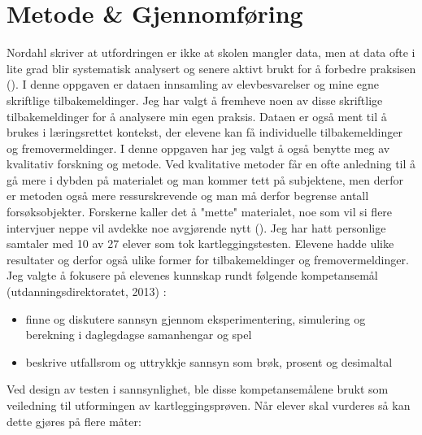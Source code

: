 \documentclass[main.tex]{subfiles}
\begin{document}
\section*{Metode \& Gjennomføring}
\label{sec:2}

Nordahl skriver at utfordringen er ikke at skolen mangler data, men at data ofte i lite grad blir
systematisk analysert og senere aktivt brukt for å forbedre praksisen ().
I denne oppgaven er dataen innsamling av elevbesvarelser og mine egne skriftlige tilbakemeldinger.
Jeg har valgt å fremheve noen av disse skriftlige tilbakemeldinger for å analysere min egen praksis.
Dataen er også ment til å brukes i læringsrettet kontekst, der elevene kan få
individuelle tilbakemeldinger og fremovermeldinger. 
\newline
\newline
I denne oppgaven har jeg valgt å også benytte meg av kvalitativ forskning og metode. Ved
kvalitative metoder får en ofte anledning til å gå mere i dybden på materialet og man kommer
tett på subjektene, men derfor er metoden også mere ressurskrevende og man må derfor
begrense antall forsøksobjekter. Forskerne kaller det å "mette" materialet, noe som vil si 
flere intervjuer neppe vil avdekke noe avgjørende nytt (). Jeg har hatt
personlige samtaler med 10 av 27 elever som tok kartleggingstesten. Elevene hadde ulike
resultater og derfor også ulike former for tilbakemeldinger og fremovermeldinger.
\newline
\newline
Jeg valgte å fokusere på elevenes kunnskap rundt følgende kompetansemål (utdanningsdirektoratet, 2013) :
\begin{itemize}
\item finne og diskutere sannsyn gjennom eksperimentering, simulering og berekning i daglegdagse samanhengar og spel
\item beskrive utfallsrom og uttrykkje sannsyn som brøk, prosent og desimaltal
\end{itemize}
Ved design av testen i sannsynlighet, ble disse kompetansemålene brukt som veiledning til
utformingen av kartleggingsprøven.
\newline
\newline
Når elever skal vurderes så kan dette gjøres på flere måter:
\end{document}
